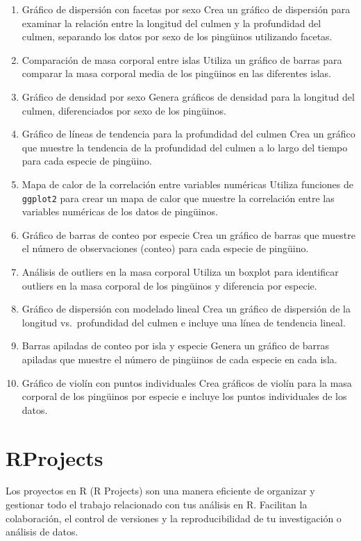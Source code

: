 \documentclass[
]{book}
\begin{document}
\begin{enumerate}
\def\labelenumi{\arabic{enumi}.}
\item
  Gráfico de dispersión con facetas por sexo
  Crea un gráfico de dispersión para examinar la relación entre la longitud del culmen y la profundidad del culmen, separando los datos por sexo de los pingüinos utilizando facetas.
\item
  Comparación de masa corporal entre islas
  Utiliza un gráfico de barras para comparar la masa corporal media de los pingüinos en las diferentes islas.
\item
  Gráfico de densidad por sexo
  Genera gráficos de densidad para la longitud del culmen, diferenciados por sexo de los pingüinos.
\item
  Gráfico de líneas de tendencia para la profundidad del culmen
  Crea un gráfico que muestre la tendencia de la profundidad del culmen a lo largo del tiempo para cada especie de pingüino.
\item
  Mapa de calor de la correlación entre variables numéricas
  Utiliza funciones de \texttt{ggplot2} para crear un mapa de calor que muestre la correlación entre las variables numéricas de los datos de pingüinos.
\item
  Gráfico de barras de conteo por especie
  Crea un gráfico de barras que muestre el número de observaciones (conteo) para cada especie de pingüino.
\item
  Análisis de outliers en la masa corporal
  Utiliza un boxplot para identificar outliers en la masa corporal de los pingüinos y diferencia por especie.
\item
  Gráfico de dispersión con modelado lineal
  Crea un gráfico de dispersión de la longitud vs.~profundidad del culmen e incluye una línea de tendencia lineal.
\item
  Barras apiladas de conteo por isla y especie
  Genera un gráfico de barras apiladas que muestre el número de pingüinos de cada especie en cada isla.
\item
  Gráfico de violín con puntos individuales
  Crea gráficos de violín para la masa corporal de los pingüinos por especie e incluye los puntos individuales de los datos.
\end{enumerate}

\chapter{RProjects}\label{rprojects}

Los proyectos en R (R Projects) son una manera eficiente de organizar y gestionar todo el trabajo relacionado con tus análisis en R. Facilitan la colaboración, el control de versiones y la reproducibilidad de tu investigación o análisis de datos.
\end{document}

